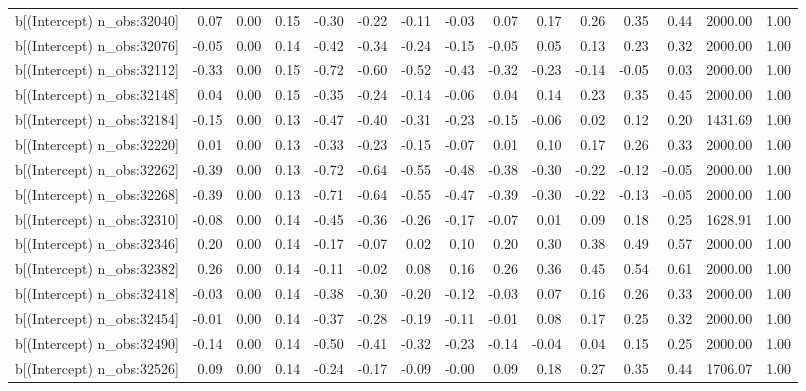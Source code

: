 \begin{table}[ht]
\begin{tabular}{rrrrrrrrrrrrrrr}
  b[(Intercept) n\_obs:32040] & 0.07 & 0.00 & 0.15 & -0.30 & -0.22 & -0.11 & -0.03 & 0.07 & 0.17 & 0.26 & 0.35 & 0.44 & 2000.00 & 1.00 \\ 
  b[(Intercept) n\_obs:32076] & -0.05 & 0.00 & 0.14 & -0.42 & -0.34 & -0.24 & -0.15 & -0.05 & 0.05 & 0.13 & 0.23 & 0.32 & 2000.00 & 1.00 \\ 
  b[(Intercept) n\_obs:32112] & -0.33 & 0.00 & 0.15 & -0.72 & -0.60 & -0.52 & -0.43 & -0.32 & -0.23 & -0.14 & -0.05 & 0.03 & 2000.00 & 1.00 \\ 
  b[(Intercept) n\_obs:32148] & 0.04 & 0.00 & 0.15 & -0.35 & -0.24 & -0.14 & -0.06 & 0.04 & 0.14 & 0.23 & 0.35 & 0.45 & 2000.00 & 1.00 \\ 
  b[(Intercept) n\_obs:32184] & -0.15 & 0.00 & 0.13 & -0.47 & -0.40 & -0.31 & -0.23 & -0.15 & -0.06 & 0.02 & 0.12 & 0.20 & 1431.69 & 1.00 \\ 
  b[(Intercept) n\_obs:32220] & 0.01 & 0.00 & 0.13 & -0.33 & -0.23 & -0.15 & -0.07 & 0.01 & 0.10 & 0.17 & 0.26 & 0.33 & 2000.00 & 1.00 \\ 
  b[(Intercept) n\_obs:32262] & -0.39 & 0.00 & 0.13 & -0.72 & -0.64 & -0.55 & -0.48 & -0.38 & -0.30 & -0.22 & -0.12 & -0.05 & 2000.00 & 1.00 \\ 
  b[(Intercept) n\_obs:32268] & -0.39 & 0.00 & 0.13 & -0.71 & -0.64 & -0.55 & -0.47 & -0.39 & -0.30 & -0.22 & -0.13 & -0.05 & 2000.00 & 1.00 \\ 
  b[(Intercept) n\_obs:32310] & -0.08 & 0.00 & 0.14 & -0.45 & -0.36 & -0.26 & -0.17 & -0.07 & 0.01 & 0.09 & 0.18 & 0.25 & 1628.91 & 1.00 \\ 
  b[(Intercept) n\_obs:32346] & 0.20 & 0.00 & 0.14 & -0.17 & -0.07 & 0.02 & 0.10 & 0.20 & 0.30 & 0.38 & 0.49 & 0.57 & 2000.00 & 1.00 \\ 
  b[(Intercept) n\_obs:32382] & 0.26 & 0.00 & 0.14 & -0.11 & -0.02 & 0.08 & 0.16 & 0.26 & 0.36 & 0.45 & 0.54 & 0.61 & 2000.00 & 1.00 \\ 
  b[(Intercept) n\_obs:32418] & -0.03 & 0.00 & 0.14 & -0.38 & -0.30 & -0.20 & -0.12 & -0.03 & 0.07 & 0.16 & 0.26 & 0.33 & 2000.00 & 1.00 \\ 
  b[(Intercept) n\_obs:32454] & -0.01 & 0.00 & 0.14 & -0.37 & -0.28 & -0.19 & -0.11 & -0.01 & 0.08 & 0.17 & 0.25 & 0.32 & 2000.00 & 1.00 \\ 
  b[(Intercept) n\_obs:32490] & -0.14 & 0.00 & 0.14 & -0.50 & -0.41 & -0.32 & -0.23 & -0.14 & -0.04 & 0.04 & 0.15 & 0.25 & 2000.00 & 1.00 \\ 
  b[(Intercept) n\_obs:32526] & 0.09 & 0.00 & 0.14 & -0.24 & -0.17 & -0.09 & -0.00 & 0.09 & 0.18 & 0.27 & 0.35 & 0.44 & 1706.07 & 1.00 \\ 

\end{tabular}
\end{table}
